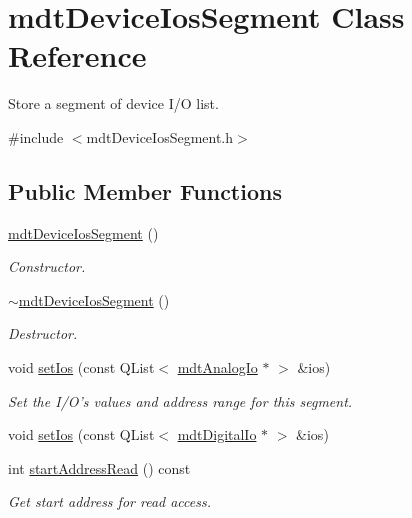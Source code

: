 \hypertarget{classmdt_device_ios_segment}{\section{mdt\-Device\-Ios\-Segment Class Reference}
\label{classmdt_device_ios_segment}
}


Store a segment of device I/\-O list.  




{\ttfamily \#include $<$mdt\-Device\-Ios\-Segment.\-h$>$}

\subsection*{Public Member Functions}
\begin{DoxyCompactItemize}
\item 
\hyperlink{classmdt_device_ios_segment_a700a57dbaeedc6d75e4230cb1fedd65b}{mdt\-Device\-Ios\-Segment} ()
\begin{DoxyCompactList}\small\item\em Constructor. \end{DoxyCompactList}\item 
\hyperlink{classmdt_device_ios_segment_a7310c0a5724f370716b0b7f1a4ad4e0a}{$\sim$mdt\-Device\-Ios\-Segment} ()
\begin{DoxyCompactList}\small\item\em Destructor. \end{DoxyCompactList}\item 
void \hyperlink{classmdt_device_ios_segment_a0542a6bf1578390e8b646e5fbd238e24}{set\-Ios} (const Q\-List$<$ \hyperlink{classmdt_analog_io}{mdt\-Analog\-Io} $\ast$ $>$ \&ios)
\begin{DoxyCompactList}\small\item\em Set the I/\-O's values and address range for this segment. \end{DoxyCompactList}\item 
void \hyperlink{classmdt_device_ios_segment_ab2ad8b6cebc1f2b6a4ae3a2a4a87b592}{set\-Ios} (const Q\-List$<$ \hyperlink{classmdt_digital_io}{mdt\-Digital\-Io} $\ast$ $>$ \&ios)
\item 
int \hyperlink{classmdt_device_ios_segment_a91dba1936e6a50ac3833190a93901e9a}{start\-Address\-Read} () const 
\begin{DoxyCompactList}\small\item\em Get start address for read access. \end{DoxyCompactList}\item 

\end{DoxyCompactItemize}
